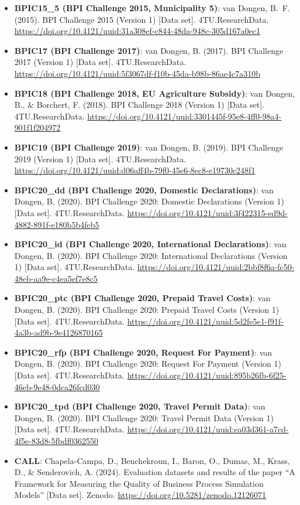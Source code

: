 \documentclass[11pt,a4paper]{article}
\begin{document}
\begin{itemize}
\item \textbf{BPIC15\_5 (BPI Challenge 2015, Municipality 5)}: van Dongen, B.~F. (2015). BPI Challenge 2015 (Version 1) [Data set]. 4TU.ResearchData. \url{https://doi.org/10.4121/uuid:31a308ef-c844-48da-948c-305d167a0ec1}
\item \textbf{BPIC17 (BPI Challenge 2017)}: van Dongen, B. (2017). BPI Challenge 2017 (Version 1) [Data set]. 4TU.ResearchData. \url{https://doi.org/10.4121/uuid:5f3067df-f10b-45da-b98b-86ae4c7a310b}
\item \textbf{BPIC18 (BPI Challenge 2018, EU Agriculture Subsidy)}: van Dongen, B., \& Borchert, F. (2018). BPI Challenge 2018 (Version 1) [Data set]. 4TU.ResearchData. \url{https://doi.org/10.4121/uuid:3301445f-95e8-4ff0-98a4-901f1f204972}
\item \textbf{BPIC19 (BPI Challenge 2019)}: van Dongen, B. (2019). BPI Challenge 2019 (Version 1) [Data set]. 4TU.ResearchData. \url{https://doi.org/10.4121/uuid:d06aff4b-79f0-45e6-8ec8-e19730c248f1}
\item \textbf{BPIC20\_dd (BPI Challenge 2020, Domestic Declarations)}: van Dongen, B. (2020). BPI Challenge 2020: Domestic Declarations (Version 1) [Data set]. 4TU.ResearchData. \url{https://doi.org/10.4121/uuid:3f422315-ed9d-4882-891f-e180b5b4feb5}
\item \textbf{BPIC20\_id (BPI Challenge 2020, International Declarations)}: van Dongen, B. (2020). BPI Challenge 2020: International Declarations (Version 1) [Data set]. 4TU.ResearchData. \url{https://doi.org/10.4121/uuid:2bbf8f6a-fc50-48eb-aa9e-c4ea5ef7e8c5}
\item \textbf{BPIC20\_ptc (BPI Challenge 2020, Prepaid Travel Costs)}: van Dongen, B. (2020). BPI Challenge 2020: Prepaid Travel Costs (Version 1) [Data set]. 4TU.ResearchData. \url{https://doi.org/10.4121/uuid:5d2fe5e1-f91f-4a3b-ad9b-9e4126870165}
\item \textbf{BPIC20\_rfp (BPI Challenge 2020, Request For Payment)}: van Dongen, B. (2020). BPI Challenge 2020: Request For Payment (Version 1) [Data set]. 4TU.ResearchData. \url{https://doi.org/10.4121/uuid:895b26fb-6f25-46eb-9e48-0dca26fcd030}
\item \textbf{BPIC20\_tpd (BPI Challenge 2020, Travel Permit Data)}: van Dongen, B. (2020). BPI Challenge 2020: Travel Permit Data (Version 1) [Data set]. 4TU.ResearchData. \url{https://doi.org/10.4121/uuid:ea03d361-a7cd-4f5e-83d8-5fbdf0362550}
\item \textbf{CALL}: Chapela-Campa, D., Benchekroun, I., Baron, O., Dumas, M., Krass, D., \& Senderovich, A. (2024). Evaluation datasets and results of the paper ``A Framework for Measuring the Quality of Business Process Simulation Models'' [Data set]. Zenodo. \url{https://doi.org/10.5281/zenodo.12126071}

\end{itemize}
\end{document}
